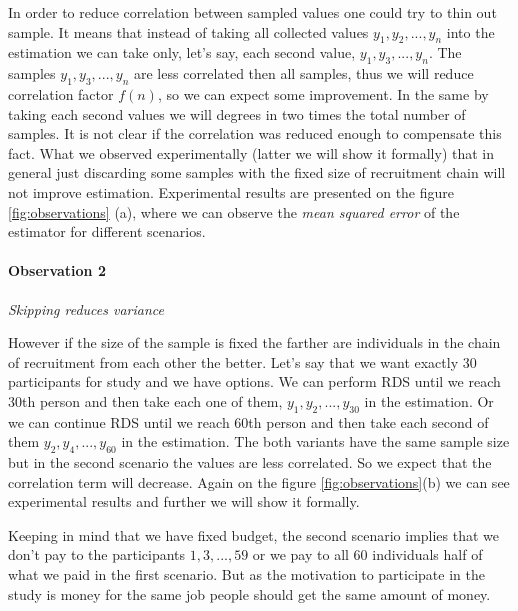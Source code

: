 \documentclass[12pt]{report}
\begin{document}
In order to reduce correlation between sampled values one could try to thin out sample. It means that instead of taking all collected values $y_1, y_2, ..., y_n$ into the estimation we can take only, let's say, each second value, $y_1, y_3, ..., y_n$. The samples $y_1, y_3, ..., y_n$ are less correlated then all samples, thus we will reduce correlation factor $f(n)$, so we can expect some improvement. In the same by taking each second values we will degrees in two times the total number of samples. It is not clear if the correlation was reduced enough to compensate this fact. What we observed experimentally (latter we will show it formally) that in general just discarding some samples with the fixed size of recruitment chain will not improve estimation. Experimental results are presented on the figure \ref{fig:observations} (a), where we can observe the \textit{mean squared error} of the estimator for different scenarios.

\paragraph{Observation 2} \textit{Skipping reduces variance}

However if the size of the sample is fixed the farther are individuals in the chain of recruitment from each other the better. Let's say that we want exactly 30 participants for study and we have options. We can perform RDS until we reach 30th person and then take each one of them, $y_1, y_2, ..., y_{30}$ in the estimation. Or we can continue RDS until we reach 60th person and then take each second of them $y_2, y_4, ..., y_{60}$ in the estimation. The both variants have the same sample size but in the second scenario the values are less correlated. So we expect that the correlation term will decrease. Again on the figure \ref{fig:observations}(b) we can see experimental results and further we will show it formally.

Keeping in mind that we have fixed budget, the second scenario implies that we don't pay to the participants $1, 3, ..., 59$ or we pay to all 60 individuals half of what we paid in the first scenario. But as the motivation to participate in the study is money for the same job people should get the same amount of money.
\end{document}
